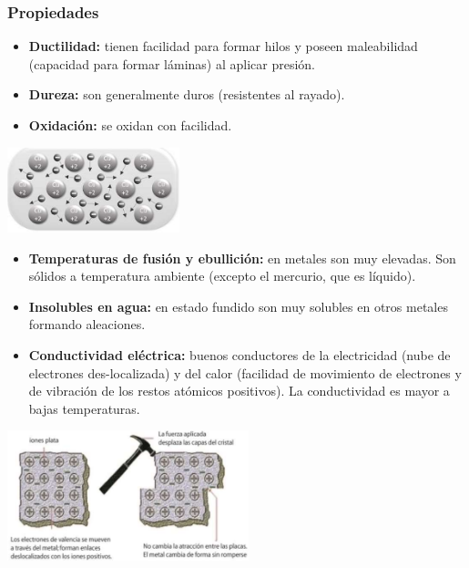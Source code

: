         \subsubsection{Propiedades}
            \begin{itemize}
                \item \textbf{Ductilidad:} tienen facilidad para formar hilos y poseen maleabilidad (capacidad para formar láminas) al aplicar presión.
                \item \textbf{Dureza:} son generalmente duros (resistentes al rayado).
                \item \textbf{Oxidación:} se oxidan con facilidad.
            \end{itemize}
            \begin{center} \includegraphics[width=5cm]{./imagenes/metalCu.png} \end{center}
            \begin{itemize}
                \item \textbf{Temperaturas de fusión y ebullición:} en metales son muy elevadas. Son sólidos a temperatura ambiente (excepto el mercurio, que es líquido).
                \item \textbf{Insolubles en agua:} en estado fundido son muy solubles en otros metales formando aleaciones.
                \item \textbf{Conductividad eléctrica:} buenos conductores de la electricidad (nube de electrones des-localizada) y del calor (facilidad de movimiento de electrones y de vibración de los restos atómicos positivos). La conductividad es mayor a bajas temperaturas.
            \end{itemize}
            \begin{center} \includegraphics[width=7cm]{./imagenes/propiedadesMetal.png} \end{center}
        
